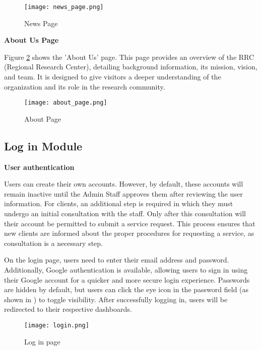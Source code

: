 \newpage

\begin{figure}[h]
	\centering
	\texttt{[image: news\_page.png]}
	\caption{News Page}
	\label{fig:news_page}
\end{figure}

\newpage

\noindent\textbf{About Us Page} 

Figure \ref{fig:about_page} shows the 'About Us' page. This page provides an overview of the RRC (Regional Research Center), detailing background information, its mission, vision, and team. It is designed to give visitors a deeper understanding of the organization and its role in the research community.

\begin{figure}[h]
	\centering
	\texttt{[image: about\_page.png]}
	\caption{About Page}
	\label{fig:about_page}
\end{figure}

\newpage

\subsection{Log in Module}

\noindent \textbf{User authentication}

Users can create their own accounts. However, by default, these accounts will remain inactive until the Admin Staff approves them after reviewing the user information. For clients, an additional step is required in which they must undergo an initial consultation with the staff. Only after this consultation will their account be permitted to submit a service request. This process ensures that new clients are informed about the proper procedures for requesting a service, as consultation is a necessary step.

On the login page, users need to enter their email address and password. Additionally, Google authentication is available, allowing users to sign in using their Google account for a quicker and more secure login experience. Passwords are hidden by default, but users can click the eye icon in the password field (as shown in ) to toggle visibility. After successfully logging in, users will be redirected to their respective dashboards.

\begin{figure}[h]
	\centering
	\texttt{[image: login.png]}
	\caption{Log in page}
	\label{fig:login}
\end{figure}


